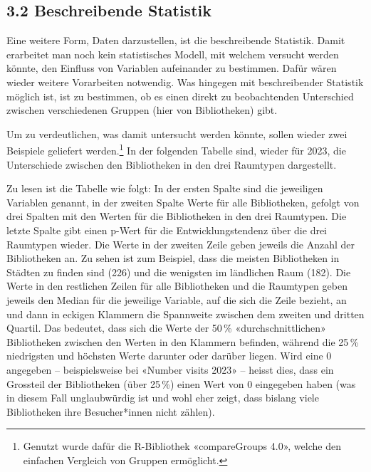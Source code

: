\documentclass[a4paper,
fontsize=11pt,
oneside,
numbers=noperiodatend,
parskip=half-,
bibliography=totoc,
final
]{scrartcl}
\begin{document}
\subsection{3.2 Beschreibende Statistik}\label{beschreibende-statistik}

Eine weitere Form, Daten darzustellen, ist die beschreibende Statistik.
Damit erarbeitet man noch kein statistisches Modell, mit welchem
versucht werden könnte, den Einfluss von Variablen aufeinander zu
bestimmen. Dafür wären wieder weitere Vorarbeiten notwendig. Was
hingegen mit beschreibender Statistik möglich ist, ist zu bestimmen, ob
es einen direkt zu beobachtenden Unterschied zwischen verschiedenen
Gruppen (hier von Bibliotheken) gibt.

Um zu verdeutlichen, was damit untersucht werden könnte, sollen wieder
zwei Beispiele geliefert werden.\footnote{Genutzt wurde dafür die
  R-Bibliothek «compareGroups 4.0», welche den einfachen Vergleich von
  Gruppen ermöglicht.} In der folgenden Tabelle sind, wieder für 2023,
die Unterschiede zwischen den Bibliotheken in den drei Raumtypen
dargestellt.

Zu lesen ist die Tabelle wie folgt: In der ersten Spalte sind die
jeweiligen Variablen genannt, in der zweiten Spalte Werte für alle
Bibliotheken, gefolgt von drei Spalten mit den Werten für die
Bibliotheken in den drei Raumtypen. Die letzte Spalte gibt einen p-Wert
für die Entwicklungstendenz über die drei Raumtypen wieder. Die Werte in
der zweiten Zeile geben jeweils die Anzahl der Bibliotheken an. Zu sehen
ist zum Beispiel, dass die meisten Bibliotheken in Städten zu finden
sind (226) und die wenigsten im ländlichen Raum (182). Die Werte in den
restlichen Zeilen für alle Bibliotheken und die Raumtypen geben jeweils
den Median für die jeweilige Variable, auf die sich die Zeile bezieht,
an und dann in eckigen Klammern die Spannweite zwischen dem zweiten und
dritten Quartil. Das bedeutet, dass sich die Werte der 50\,\%
«durchschnittlichen» Bibliotheken zwischen den Werten in den Klammern
befinden, während die 25\,\% niedrigsten und höchsten Werte darunter
oder darüber liegen. Wird eine 0 angegeben -- beispielsweise bei «Number
visits 2023» -- heisst dies, dass ein Grossteil der Bibliotheken (über
25\,\%) einen Wert von 0 eingegeben haben (was in diesem Fall
unglaubwürdig ist und wohl eher zeigt, dass bislang viele Bibliotheken
ihre Besucher*innen nicht zählen).
\end{document}
